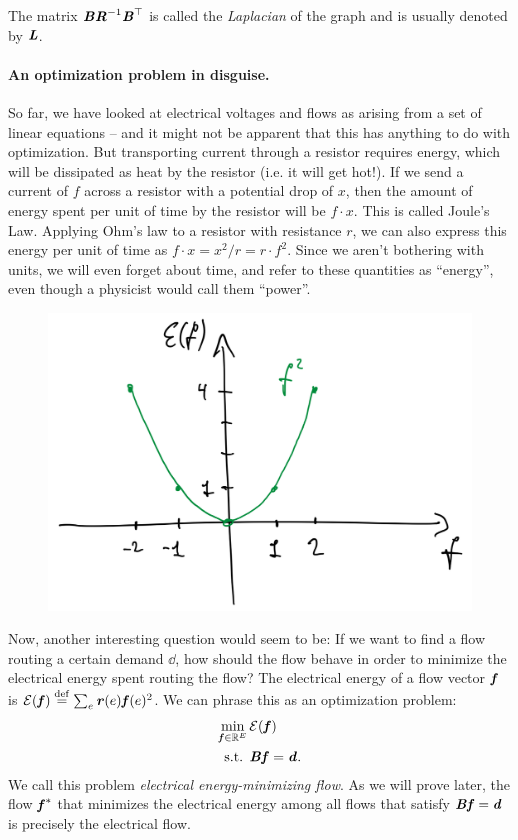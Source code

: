 The matrix $\boldsymbol{\mathit{B}} \boldsymbol{\mathit{R}}^{-1}\boldsymbol{\mathit{B}}^{\top}$ is called the \emph{Laplacian} of
the graph and is usually denoted by $\boldsymbol{\mathit{L}}$.

\paragraph{An optimization problem in disguise.}
So far, we have looked at electrical voltages and flows as arising
from a set of linear equations -- and it might not be apparent that
this has anything to do with optimization.
But transporting current through a resistor requires energy, which will be
dissipated as heat by the resistor (i.e. it will get hot!).
If we send a current of $f$ across a resistor with a potential drop of
$x$, then the amount of energy spent per unit of time by the resistor will be
$f \cdot x$. This is called Joule's Law.
Applying Ohm's law to a resistor with resistance $r$,
we can also express this energy per unit of time
as $f \cdot x = x^2 / r = r \cdot f ^2$.
Since we aren't bothering with units, we will even forget about time,
and refer to these quantities as ``energy'', even though a physicist
would call them ``power''.

\begin{figure}[H]
  \centering
  \includegraphics[width=0.6\linewidth]{fig/lecture1_flow-vs-energy.png}
  \label{fig:flow-vs-energy}
\end{figure}

Now, another interesting question would seem to be: If we want to find
a flow routing a certain demand $\dd$, how should the flow behave in
order to minimize the electrical energy spent routing the flow?
The electrical energy of a flow vector $\boldsymbol{\mathit{f}}$ is $\mathcal{E}(\boldsymbol{\mathit{f}}) \stackrel{\mathrm{def}}{=} \sum_e \boldsymbol{\mathit{r}}(e) \boldsymbol{\mathit{f}}(e)^2$.
We can phrase this as an optimization problem:
\begin{align*}
  \min_{\boldsymbol{\mathit{f}} \in \mathbb{R}^E} \, & \mathcal{E}(\boldsymbol{\mathit{f}})
  \\
  \textrm{s.t. } & \boldsymbol{\mathit{B}} \boldsymbol{\mathit{f}} = \boldsymbol{\mathit{d}} .
\end{align*}
We call this problem \emph{electrical energy-minimizing flow}.
As we will prove later, the flow $\boldsymbol{\mathit{f}}^*$ that minimizes the electrical
energy among all flows that satisfy $\boldsymbol{\mathit{B}} \boldsymbol{\mathit{f}} = \boldsymbol{\mathit{d}}$ is precisely the
electrical flow.

